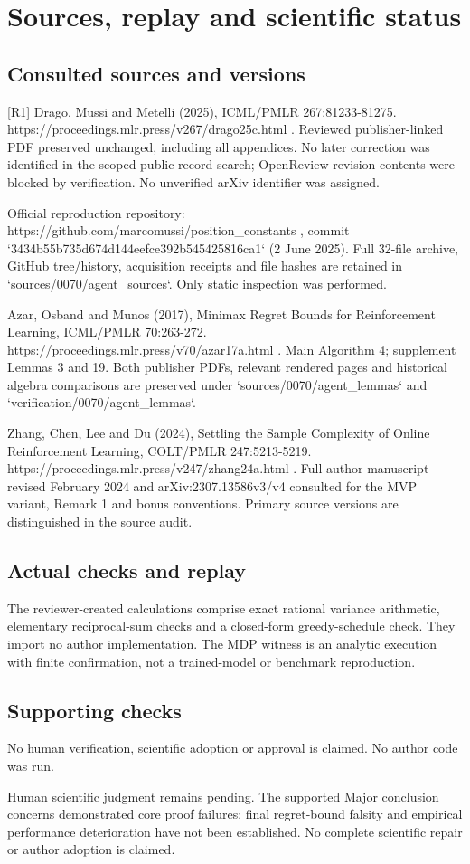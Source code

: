 \documentclass[10pt]{article}
\begin{document}
\section*{Sources, replay and scientific status}
\subsection*{Consulted sources and versions}
[R1] Drago, Mussi and Metelli (2025), ICML/PMLR 267:81233-81275. https://proceedings.mlr.press/v267/drago25c.html . Reviewed publisher-linked PDF preserved unchanged, including all appendices. No later correction was identified in the scoped public record search; OpenReview revision contents were blocked by verification. No unverified arXiv identifier was assigned.\par
[R2] Official reproduction repository: https://github.com/marcomussi/position\_constants , commit `3434b55b735d674d144eefce392b545425816ca1` (2 June 2025). Full 32-file archive, GitHub tree/history, acquisition receipts and file hashes are retained in `sources/0070/agent\_sources`. Only static inspection was performed.\par
[R3] Azar, Osband and Munos (2017), Minimax Regret Bounds for Reinforcement Learning, ICML/PMLR 70:263-272. https://proceedings.mlr.press/v70/azar17a.html . Main Algorithm 4; supplement Lemmas 3 and 19. Both publisher PDFs, relevant rendered pages and historical algebra comparisons are preserved under `sources/0070/agent\_lemmas` and `verification/0070/agent\_lemmas`.\par
[R4] Zhang, Chen, Lee and Du (2024), Settling the Sample Complexity of Online Reinforcement Learning, COLT/PMLR 247:5213-5219. https://proceedings.mlr.press/v247/zhang24a.html . Full author manuscript revised February 2024 and arXiv:2307.13586v3/v4 consulted for the MVP variant, Remark 1 and bonus conventions. Primary source versions are distinguished in the source audit.\par
\subsection*{Actual checks and replay}
The reviewer-created calculations comprise exact rational variance arithmetic, elementary reciprocal-sum checks and a closed-form greedy-schedule check. They import no author implementation. The MDP witness is an analytic execution with finite confirmation, not a trained-model or benchmark reproduction.\par
\subsection*{Supporting checks}
No human verification, scientific adoption or approval is claimed. No author code was run.\par
Human scientific judgment remains pending. The supported Major conclusion concerns demonstrated core proof failures; final regret-bound falsity and empirical performance deterioration have not been established. No complete scientific repair or author adoption is claimed.\par
\end{document}
